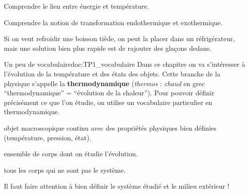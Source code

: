 \teteSndTran

\vspace*{-32pt}

\begin{objectifs}
  \item Comprendre le lien entre énergie et température.
  \item Comprendre la notion de transformation endothermique et exothermique.
\end{objectifs}

\begin{contexte}
  Si on veut refroidir une boisson tiède, on peut la placer dans un réfrigérateur, mais une solution bien plus rapide est de rajouter des glaçons dedans.
  
\end{contexte}


\begin{doc}{Un peu de vocabulaire}{doc:TP1_vocabulaire}
  Dans ce chapitre on va s'intéresser à l'évolution de la température et des états des objets.
  Cette branche de la physique s'appelle la \textbf{thermodynamique} (\og \textit{thermos} \fg : \textit{chaud} en grec ``thermodynamique'' = ``évolution de la chaleur'').
  Pour pouvoir définir précisément ce que l'on étudie, on utilise un vocabulaire particulier en thermodynamique.
  
  \begin{importants}
    \begin{listePoints}
      \item {} objet macroscopique continu avec des propriétés physiques bien définies (température, pression, état).
      \item {} ensemble de corps dont on étudie l'évolution.
      \item {} tous les corps qui ne sont pas le système.
    \end{listePoints}
  \end{importants}
  \attention Il faut faire attention à bien définir le système étudié et le milieu extérieur !
\end{doc}

